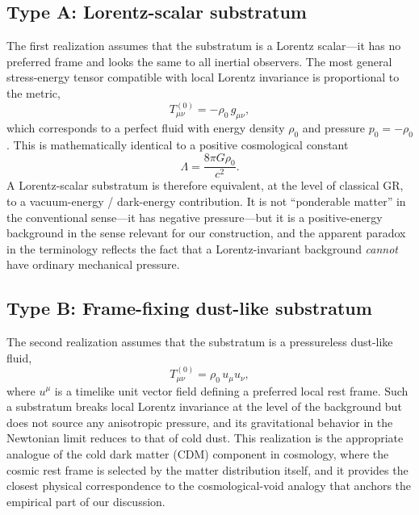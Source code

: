 \documentclass[%
  reprint,
  superscriptaddress,
  showpacs,
  showkeys,
  amsmath,amssymb,
  pra,
  longbibliography,
  floatfix,
  x11names
]{revtex4-2}
\begin{document}
\subsection{Type A: Lorentz-scalar substratum}
\label{sec:typeA}

The first realization assumes that the substratum is a Lorentz scalar---it has no preferred frame and looks the same to all inertial observers. The most general stress-energy tensor compatible with local Lorentz invariance is proportional to the metric,
\begin{equation}
T^{(0)}_{\mu\nu} = -\rho_0\, g_{\mu\nu},
\label{eq:T0_lorentz}
\end{equation}
which corresponds to a perfect fluid with energy density $\rho_0$ and pressure $p_0 = -\rho_0$. This is mathematically identical to a positive cosmological constant
\begin{equation}
\Lambda = \frac{8\pi G \rho_0}{c^2}.
\label{eq:Lambda_def}
\end{equation}
A Lorentz-scalar substratum is therefore equivalent, at the level of classical GR, to a vacuum-energy / dark-energy contribution. It is not ``ponderable matter'' in the conventional sense---it has negative pressure---but it is a positive-energy background in the sense relevant for our construction, and the apparent paradox in the terminology reflects the fact that a Lorentz-invariant background \emph{cannot} have ordinary mechanical pressure.

\subsection{Type B: Frame-fixing dust-like substratum}
\label{sec:typeB}

The second realization assumes that the substratum is a pressureless dust-like fluid,
\begin{equation}
T^{(0)}_{\mu\nu} = \rho_0\, u_\mu u_\nu,
\label{eq:T0_dust}
\end{equation}
where $u^\mu$ is a timelike unit vector field defining a preferred local rest frame. Such a substratum breaks local Lorentz invariance at the level of the background but does not source any anisotropic pressure, and its gravitational behavior in the Newtonian limit reduces to that of cold dust. This realization is the appropriate analogue of the cold dark matter (CDM) component in cosmology, where the cosmic rest frame is selected by the matter distribution itself, and it provides the closest physical correspondence to the cosmological-void analogy that anchors the empirical part of our discussion.
\end{document}
